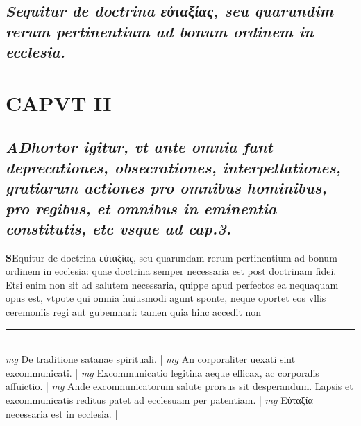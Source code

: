 \documentclass{article}
\begin{document}
\begin{pages}
{}
\subsection*{\textit{Sequitur de doctrina εὐταξίας, seu quarundim rerum pertinentium ad bonum ordinem in ecclesia. }}
\endnumbering\beginnumbering\section{CAPVT II}
{}
\subsection*{\textit{\huge\textbf{A}\normalsize Dhortor igitur, vt ante omnia fant deprecationes, obsecrationes, interpellationes, gratiarum actiones pro omnibus hominibus, pro regibus, et omnibus in eminentia constitutis, etc vsque  ad cap.3. }}\pstart \huge\textbf{S}\normalsize Equitur de doctrina εὐταξίας, seu quarundam rerum pertinentium ad bonum ordinem in ecclesia: quae doctrina semper necessaria est post doctrinam fidei. Etsi enim non sit ad salutem necessaria, quippe apud perfectos ea nequaquam opus est, vtpote qui omnia huiusmodi agunt sponte, neque oportet eos vllis ceremoniis regi aut gubemnari: tamen quia hinc accedit non\pend
\vspace{0.5cm}\noindent
\vspace{0.2cm}\rule{1cm}{0.2pt}\\ 
\hspace{0.2cm}\textit{mg}
\footnotesize De traditione satanae spirituali. 
\normalsize| 
\hspace{0.2cm}\textit{mg}
\footnotesize An corporaliter uexati sint excommunicati. 
\normalsize| 
\hspace{0.2cm}\textit{mg}
\footnotesize Excommunicatio legitina aeque  efficax, ac corporalis affuictio. 
\normalsize| 
\hspace{0.2cm}\textit{mg}
\footnotesize Ande exconmunicatorum salute prorsus sit desperandum. Lapsis et excommunicatis reditus patet ad ecclesuam per patentiam. 
\normalsize| 
\hspace{0.2cm}\textit{mg}
\footnotesize Εὐταξία necessaria est in ecclesia. 
\normalsize| 

\end{pages}
\end{document}
